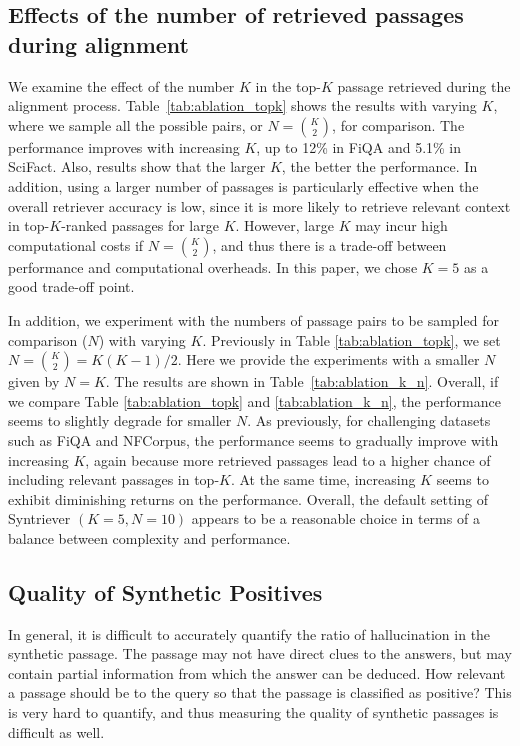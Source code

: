 \subsection{Effects of the number of retrieved passages during alignment} 
We examine the effect of the number $K$ in the top-$K$ passage retrieved during the alignment process. Table~\ref{tab:ablation_topk} shows the results with varying $K$, where we sample all the possible pairs, or $N={K \choose 2}$, for comparison. The performance improves with increasing $K$, up to 12\% in FiQA and 5.1\% in SciFact. Also, results show that the larger $K$, the better the performance. In addition, using a larger number of passages is particularly effective when the overall retriever accuracy is low, since it is more likely to retrieve relevant context in top-$K$-ranked passages for large $K$. However, large $K$ may incur high computational costs if $N={K \choose 2}$, and thus there is a trade-off between performance and computational overheads. In this paper, we chose $K=5$ as a good trade-off point.

In addition, we experiment with the numbers of passage pairs to be sampled for comparison ($N$) with varying $K$. Previously in Table \ref{tab:ablation_topk}, we set $N={K\choose 2}=K(K-1)/2$. Here we provide the experiments with a smaller $N$  given by $N=K$. The results are shown in   Table~\ref{tab:ablation_k_n}. Overall, if we compare Table \ref{tab:ablation_topk} and \ref{tab:ablation_k_n}, the performance seems to slightly degrade for smaller $N$. As previously, for challenging datasets such as FiQA and NFCorpus, the performance seems to gradually improve with increasing $K$, again because more retrieved passages lead to a higher chance of including relevant passages in top-$K$. At the same time, increasing $K$ seems to exhibit diminishing returns on the performance. Overall, the default setting of Syntriever $(K=5, N=10)$ appears to be a reasonable choice in terms of a balance between complexity and performance. 

\subsection{Quality of Synthetic Positives} In general, it is difficult to accurately quantify the ratio of hallucination in the synthetic passage. The passage may not have direct clues to the answers, but may contain partial information from which the answer can be deduced. How relevant a passage should be to the query so that the passage is classified as positive? This is very hard to quantify, and thus measuring the quality of synthetic passages is difficult as well.

